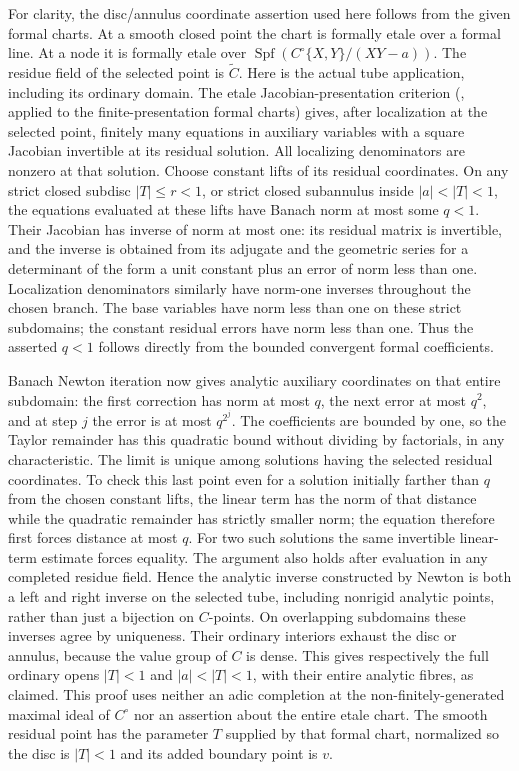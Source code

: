 \documentclass[11pt]{article}
\begin{document}
\begin{enumerate}
For clarity, the disc/annulus coordinate assertion used here follows
from the given formal charts. At a smooth closed point the chart is
formally etale over a formal line. At a node it is formally etale over
$\operatorname{Spf}(C^\circ\{X,Y\}/(XY-a))$.
The residue field of the selected point is $\widetilde C$. Here is
the actual tube application, including its ordinary domain. The
etale Jacobian-presentation criterion
(\cite[IV, 17.6]{EGA}, applied to the finite-presentation formal
charts) gives, after localization at the selected point, finitely
many equations in auxiliary variables with a square Jacobian
invertible at its residual solution. All localizing denominators
are nonzero at that solution. Choose constant lifts of its residual
coordinates. On any strict closed subdisc $|T|\leq r<1$, or strict
closed subannulus inside $|a|<|T|<1$, the equations evaluated at
these lifts have Banach norm at most some $q<1$. Their Jacobian
has inverse of norm at most one: its residual matrix is invertible,
and the inverse is obtained from its adjugate and the geometric
series for a determinant of the form a unit constant plus an error
of norm less than one. Localization denominators similarly have
norm-one inverses throughout the chosen branch. The base variables
have norm less than one on these strict subdomains; the constant
residual errors have norm less than one. Thus the asserted $q<1$
follows directly from the bounded convergent formal coefficients.

Banach Newton iteration now gives analytic auxiliary coordinates
on that entire subdomain: the first correction has norm at most
$q$, the next error at most $q^2$, and at step $j$ the error is
at most $q^{2^j}$. The coefficients are bounded by one, so the
Taylor remainder has this quadratic bound without dividing by
factorials, in any characteristic. The limit is unique among
solutions having the selected residual coordinates. To check this
last point even for a solution initially farther than $q$ from
the chosen constant lifts, the linear term has the norm of that
distance while the quadratic remainder has strictly smaller norm;
the equation therefore first forces distance at most $q$.
For two such solutions the same invertible linear-term estimate
forces equality. The argument also holds after evaluation in any
completed residue field. Hence the analytic inverse constructed by
Newton is both a left and right inverse on the selected tube,
including nonrigid analytic points, rather than just a bijection
on $C$-points. On overlapping subdomains these inverses agree by
uniqueness. Their ordinary interiors exhaust the disc or annulus,
because the value group of $C$ is dense. This gives respectively
the full ordinary opens $|T|<1$ and $|a|<|T|<1$, with their
entire analytic fibres, as claimed. This proof uses neither an
adic completion at the non-finitely-generated maximal ideal of
$C^\circ$ nor an assertion about the entire etale chart.
The smooth residual point has the parameter $T$ supplied by that
formal chart, normalized so the disc is $|T|<1$ and its added
boundary point is $v$.


\end{enumerate}
\end{document}
